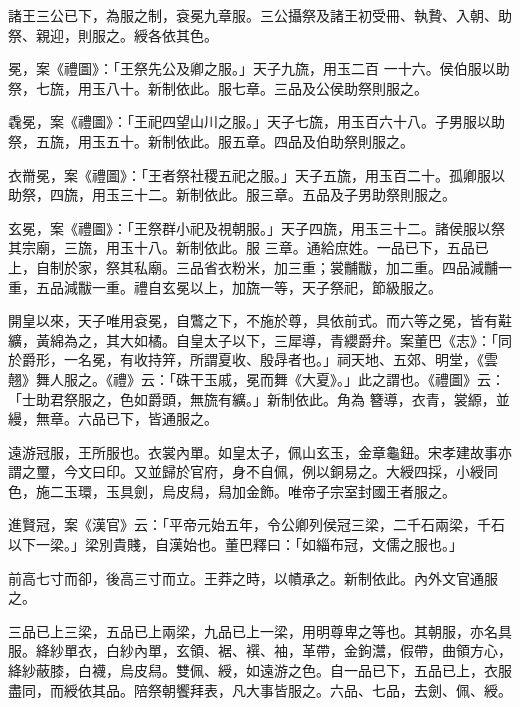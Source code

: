 \begin{pinyinscope}
 諸王三公已下，為服之制，袞冕九章服。三公攝祭及諸王初受冊、執贄、入朝、助祭、親迎，則服之。綬各依其色。



 冕，案《禮圖》：「王祭先公及卿之服。」天子九旒，用玉二百
 一十六。侯伯服以助祭，七旒，用玉八十。新制依此。服七章。三品及公侯助祭則服之。



 毳冕，案《禮圖》：「王祀四望山川之服。」天子七旒，用玉百六十八。子男服以助祭，五旒，用玉五十。新制依此。服五章。四品及伯助祭則服之。



 衣黹冕，案《禮圖》：「王者祭社稷五祀之服。」天子五旒，用玉百二十。孤卿服以助祭，四旒，用玉三十二。新制依此。服三章。五品及子男助祭則服之。



 玄冕，案《禮圖》：「王祭群小祀及視朝服。」天子四旒，用玉三十二。諸侯服以祭其宗廟，三旒，用玉十八。新制依此。服
 三章。通給庶姓。一品已下，五品已上，自制於家，祭其私廟。三品省衣粉米，加三重；裳黼黻，加二重。四品減黼一重，五品減黻一重。禮自玄冕以上，加旒一等，天子祭祀，節級服之。



 開皇以來，天子唯用袞冕，自鷩之下，不施於尊，具依前式。而六等之冕，皆有黈纊，黃綿為之，其大如橘。自皇太子以下，三犀導，青纓爵弁。案董巴《志》：「同於爵形，一名冕，有收持笄，所謂夏收、殷冔者也。」祠天地、五郊、明堂，《雲翹》舞人服之。《禮》云：「硃干玉戚，冕而舞《大夏》。」此之謂也。《禮圖》云：「士助君祭服之，色如爵頭，無旒有纊。」新制依此。角為
 簪導，衣青，裳縓，並縵，無章。六品已下，皆通服之。



 遠游冠服，王所服也。衣裳內單。如皇太子，佩山玄玉，金章龜鈕。宋孝建故事亦謂之璽，今文曰印。又並歸於官府，身不自佩，例以銅易之。大綬四採，小綬同色，施二玉環，玉具劍，烏皮舄，舄加金飾。唯帝子宗室封國王者服之。



 進賢冠，案《漢官》云：「平帝元始五年，令公卿列侯冠三梁，二千石兩梁，千石以下一梁。」梁別貴賤，自漢始也。董巴釋曰：「如緇布冠，文儒之服也。」



 前高七寸而卻，後高三寸而立。王莽之時，以幘承之。新制依此。內外文官通服之。



 三品已上三梁，五品已上兩梁，九品已上一梁，用明尊卑之等也。其朝服，亦名具服。絳紗單衣，白紗內單，玄領、裾、襈、袖，革帶，金鉤灊，假帶，曲領方心，絳紗蔽膝，白襪，烏皮舄。雙佩、綬，如遠游之色。自一品已下，五品已上，衣服盡同，而綬依其品。陪祭朝饗拜表，凡大事皆服之。六品、七品，去劍、佩、綬。




\end{pinyinscope}
